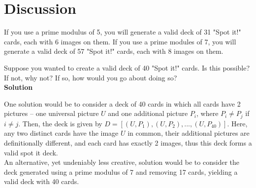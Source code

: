\documentclass{article}
\begin{document}
   
\section{Discussion}
If you use a prime modulus of 5, you will generate a valid deck of 31 "Spot it!" cards, each with 6 images on them. If you use a prime modules of 7, you will generate a valid deck of 57 "Spot it!" cards, each with 8 images on them.

Suppose you wanted to create a valid deck of 40 "Spot it!" cards. Is this possible? If not, why not? If so, how would you go about doing so?
   \\
   
   \textbf{Solution}
    
    One solution would be to consider a deck of 40 cards in which all cards have 2 pictures -- one universal picture $U$ and one additional picture $P_i$, where $P_i \neq P_j$ if $i \neq j$. Then, the deck is given by $D = [(U, P_1), (U, P_2), ..., (U, P_{40})]$. Here, any two distinct cards have the image $U$ in common, their additional pictures are definitionally different, and each card has exactly 2 images, thus this deck forms a valid spot it deck. \\
    An alternative, yet undeniably less creative, solution would be to consider the deck generated using a prime modulus of 7 and removing 17 cards, yielding a valid deck with 40 cards. 
\end{document}
